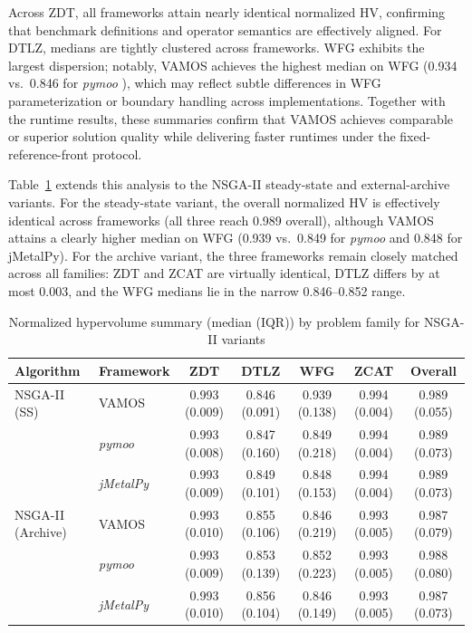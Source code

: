 \documentclass[final,5p,times,twocolumn]{elsarticle}
\newcommand{\VAMOS}{VAMOS}
\begin{document}
Across ZDT, all frameworks attain nearly identical normalized HV, confirming that benchmark definitions and operator semantics are effectively aligned. For DTLZ, medians are tightly clustered across frameworks. WFG exhibits the largest dispersion; notably, \VAMOS{} achieves the highest median on WFG (0.934 vs.\ 0.846 for \textit{pymoo} ), which may reflect subtle differences in WFG parameterization or boundary handling across implementations. Together with the runtime results, these summaries confirm that \VAMOS{} achieves comparable or superior solution quality while delivering faster runtimes under the fixed-reference-front protocol.

Table~\ref{tab:frameworks_hv_variants} extends this analysis to the NSGA-II steady-state and external-archive variants. For the steady-state variant, the overall normalized HV is effectively identical across frameworks (all three reach 0.989 overall), although \VAMOS{} attains a clearly higher median on WFG (0.939 vs.\ 0.849 for \textit{pymoo}  and 0.848 for jMetalPy). For the archive variant, the three frameworks remain closely matched across all families: ZDT and ZCAT are virtually identical, DTLZ differs by at most 0.003, and the WFG medians lie in the narrow 0.846--0.852 range.

\begin{table}[htbp]
\centering
\caption{Normalized hypervolume summary (median (IQR)) by problem family for NSGA-II variants}
\label{tab:frameworks_hv_variants}
\begin{tabular}{@{}llccccc@{}}
\toprule
\textbf{Algorithm} & \textbf{Framework} & \textbf{ZDT} & \textbf{DTLZ} & \textbf{WFG} & \textbf{ZCAT} & \textbf{Overall} \\
\midrule
NSGA-II (SS) & VAMOS & 0.993 (0.009) & 0.846 (0.091) & 0.939 (0.138) & 0.994 (0.004) & 0.989 (0.055) \\
 & \textit{pymoo}  & 0.993 (0.008) & 0.847 (0.160) & 0.849 (0.218) & 0.994 (0.004) & 0.989 (0.073) \\
 & \textit{jMetalPy} & 0.993 (0.009) & 0.849 (0.101) & 0.848 (0.153) & 0.994 (0.004) & 0.989 (0.073) \\
\midrule
NSGA-II (Archive) & VAMOS & 0.993 (0.010) & 0.855 (0.106) & 0.846 (0.219) & 0.993 (0.005) & 0.987 (0.079) \\
 & \textit{pymoo}  & 0.993 (0.009) & 0.853 (0.139) & 0.852 (0.223) & 0.993 (0.005) & 0.988 (0.080) \\
 & \textit{jMetalPy} & 0.993 (0.010) & 0.856 (0.104) & 0.846 (0.149) & 0.993 (0.005) & 0.987 (0.073) \\
\bottomrule
\end{tabular}
\end{table}
\end{document}
